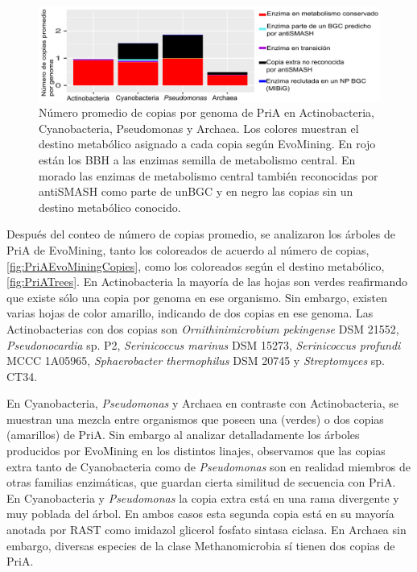 \documentclass[]{article}
\begin{document}
\begin{figure}[h!tbp]
\centering
\includegraphics[angle = 0,scale = 0.8]{chapter4/PriAExpansiones.png}
\caption[Expansiones de PriA en Actinobacteria, Cyanobacteria, Pseudomonas y Archaea]{\footnotesize{Número promedio de copias por genoma de PriA en Actinobacteria, Cyanobacteria, Pseudomonas y Archaea. Los colores muestran el destino metabólico asignado a cada copia según EvoMining. En rojo están los BBH a las enzimas semilla de metabolismo central. En morado las enzimas de metabolismo central también reconocidas por antiSMASH como parte de unBGC y en negro las copias sin un destino metabólico conocido.}}
\label{fig:PriA_Expansiones}
\end{figure}

Después del conteo de número de copias promedio, se analizaron los
árboles de PriA de EvoMining, tanto los coloreados de acuerdo al número
de copias, \autoref{fig:PriAEvoMiningCopies}, como los coloreados según
el destino metabólico, \autoref{fig:PriATrees}. En Actinobacteria la
mayoría de las hojas son verdes reafirmando que existe sólo una copia
por genoma en ese organismo. Sin embargo, existen varias hojas de color
amarillo, indicando de dos copias en ese genoma. Las Actinobacterias con
dos copias son \emph{Ornithinimicrobium pekingense} DSM 21552,
\emph{Pseudonocardia} sp. P2, \emph{Serinicoccus marinus} DSM 15273,
\emph{Serinicoccus profundi} MCCC 1A05965, \emph{Sphaerobacter
thermophilus} DSM 20745 y \emph{Streptomyces} sp. CT34.

En Cyanobacteria, \emph{Pseudomonas} y Archaea en contraste con
Actinobacteria, se muestran una mezcla entre organismos que poseen una
(verdes) o dos copias (amarillos) de PriA. Sin embargo al analizar
detalladamente los árboles producidos por EvoMining en los distintos
linajes, observamos que las copias extra tanto de Cyanobacteria como de
\emph{Pseudomonas} son en realidad miembros de otras familias
enzimáticas, que guardan cierta similitud de secuencia con PriA. En
Cyanobacteria y \emph{Pseudomonas} la copia extra está en una rama
divergente y muy poblada del árbol. En ambos casos esta segunda copia
está en su mayoría anotada por RAST como imidazol glicerol fosfato
sintasa ciclasa. En Archaea sin embargo, diversas especies de la clase
Methanomicrobia sí tienen dos copias de PriA.
\end{document}

